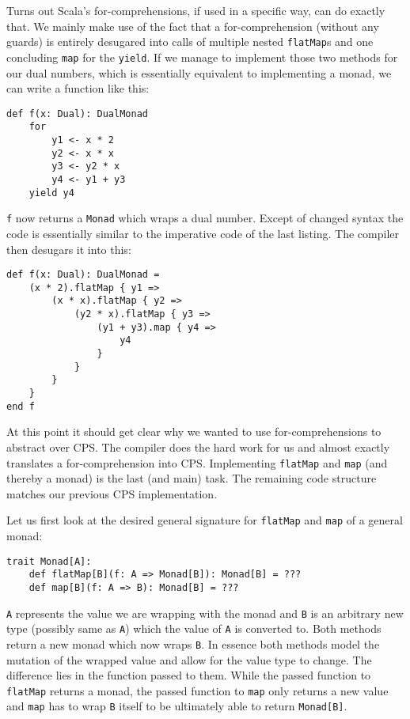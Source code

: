 Turns out Scala's for-comprehensions, if used in a specific way, can do exactly that. We mainly make use of the fact that a for-comprehension (without any guards) is entirely desugared into calls of multiple nested \lstinline{flatMap}s and one concluding \lstinline{map} for the \lstinline{yield}. If we manage to implement those two methods for our dual numbers, which is essentially equivalent to implementing a monad, we can write a function like this:
\begin{lstlisting}
def f(x: Dual): DualMonad
    for
        y1 <- x * 2
        y2 <- x * x
        y3 <- y2 * x
        y4 <- y1 + y3
    yield y4    
\end{lstlisting}
\lstinline{f} now returns a \lstinline{Monad} which wraps a dual number. Except of changed syntax the code is essentially similar to the imperative code of the last listing. The compiler then desugars it into this:
\begin{lstlisting}[caption={Desugared for-comprehension}, label={lst:desugaredForComprehension}]
def f(x: Dual): DualMonad =
    (x * 2).flatMap { y1 =>
        (x * x).flatMap { y2 =>
            (y2 * x).flatMap { y3 =>
                (y1 + y3).map { y4 =>
                    y4
                }
            }
        }
    }
end f  
\end{lstlisting}
At this point it should get clear why we wanted to use for-comprehensions to abstract over CPS. The compiler does the hard work for us and almost exactly translates a for-comprehension into CPS. Implementing \lstinline{flatMap} and \lstinline{map} (and thereby a monad) is the last (and main) task. The remaining code structure matches our previous CPS implementation.

Let us first look at the desired general signature for \lstinline{flatMap} and \lstinline{map} of a general monad:
\begin{lstlisting}
trait Monad[A]:
    def flatMap[B](f: A => Monad[B]): Monad[B] = ???
    def map[B](f: A => B): Monad[B] = ???
\end{lstlisting}
\lstinline{A} represents the value we are wrapping with the monad and \lstinline{B} is an arbitrary new type (possibly same as \lstinline{A}) which the value of \lstinline{A} is converted to. Both methods return a new monad which now wraps \lstinline{B}. In essence both methods model the mutation of the wrapped value and allow for the value type to change. The difference lies in the function passed to them. While the passed function to \lstinline{flatMap} returns a monad, the passed function to \lstinline{map} only returns a new value and \lstinline{map} has to wrap \lstinline{B} itself to be ultimately able to return \lstinline{Monad[B]}. 

